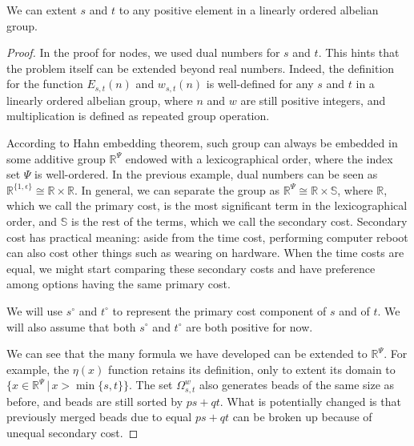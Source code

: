 \documentclass[]{article}
\begin{document}
\vspace{1cm}
\begin{lemma} 
We can extent $s$ and $t$ to any positive element in a linearly ordered albelian group.
\end{lemma}
\begin{proof}

In the proof for nodes, we used dual numbers for $s$ and $t$. This hints that the problem itself can be extended beyond real numbers. Indeed, the definition for the function $E_{s,t}(n)$ and $w_{s,t}(n)$ is well-defined for any $s$ and $t$ in a linearly ordered albelian group, where $n$ and $w$ are still positive integers, and multiplication is defined as repeated group operation.

According to Hahn embedding theorem, such group can always be embedded in some additive group $\mathbb{R}^\Psi$ endowed with a lexicographical order, where the index set $\Psi$ is well-ordered. In the previous example, dual numbers can be seen as $\mathbb{R}^{\{1, \epsilon \}} \cong \mathbb{R}\times\mathbb{R}$. In general, we can separate the group as $\mathbb{R}^\Psi \cong \mathbb{R}\times\mathbb{S}$, where $\mathbb{R}$, which we call the primary cost, is the most significant term in the lexicographical order, and $\mathbb{S}$ is the rest of the terms, which we call the secondary cost. Secondary cost has practical meaning: aside from the time cost, performing computer reboot can also cost other things such as wearing on hardware. When the time costs are equal, we might start comparing these secondary costs and have preference among options having the same primary cost.

We will use $s^\circ$ and $t^\circ$ to represent the primary cost component of $s$ and of $t$. We will also assume that both $s^\circ$ and $t^\circ$ are both positive for now. 

We can see that the many formula we have developed can be extended to $\mathbb{R}^\Psi$. For example, the $\eta(x)$ function retains its definition, only to extent its domain to $\{x\in\mathbb{R}^\Psi \,|\, x > \min\{s, t\}\}$. The set $\Omega_{s,t}^w$ also generates beads of the same size as before, and beads are still sorted by $ps+qt$. What is potentially changed is that previously merged beads due to equal $ps+qt$ can be broken up because of unequal secondary cost.


\end{proof}
\end{document}
